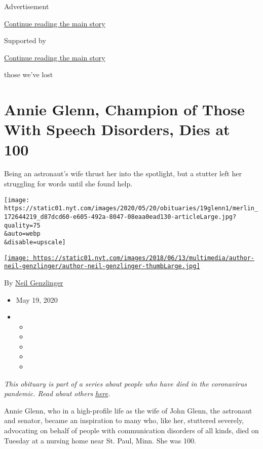 Advertisement

\protect\hyperlink{after-top}{Continue reading the main story}

Supported by

\protect\hyperlink{after-sponsor}{Continue reading the main story}

those we've lost

\hypertarget{annie-glenn-champion-of-those-with-speech-disorders-dies-at-100}{%
\section{Annie Glenn, Champion of Those With Speech Disorders, Dies at
100}\label{annie-glenn-champion-of-those-with-speech-disorders-dies-at-100}}

Being an astronaut's wife thrust her into the spotlight, but a stutter
left her struggling for words until she found help.

\texttt{[image: https://static01.nyt.com/images/2020/05/20/obituaries/19glenn1/merlin\_172644219\_d87dcd60-e605-492a-8047-08eaa0ead130-articleLarge.jpg?quality=75\\\&auto=webp\\\&disable=upscale]}

\href{https://www.nytimes.com/by/neil-genzlinger}{\texttt{[image: https://static01.nyt.com/images/2018/06/13/multimedia/author-neil-genzlinger/author-neil-genzlinger-thumbLarge.jpg]}}

By \href{https://www.nytimes.com/by/neil-genzlinger}{Neil Genzlinger}

\begin{itemize}
\item
  May 19, 2020
\item
  \begin{itemize}
  \item
  \item
  \item
  \item
  \item
  \end{itemize}
\end{itemize}

\emph{This obituary is part of a series about people who have died in
the coronavirus pandemic. Read about others}
\href{https://www.nytimes.com/series/people-who-have-died-of-the-coronavirus}{\emph{here}}\emph{.}

Annie Glenn, who in a high-profile life as the wife of John Glenn, the
astronaut and senator, became an inspiration to many who, like her,
stuttered severely, advocating on behalf of people with communication
disorders of all kinds, died on Tuesday at a nursing home near St. Paul,
Minn. She was 100.

